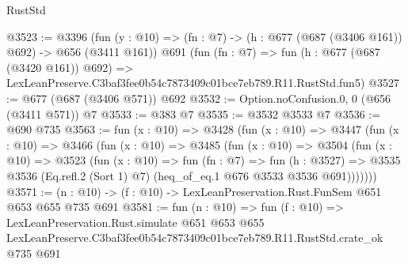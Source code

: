 \begin{lexlean}{RustStd}
\begin{coremodule}
@3523 := @3396
    (fun (y : @10) => (fn : @7) -> (h : @677 (@687 (@3406 @161)) @692) -> @656 (@3411 @161))
    @691
    (fun (fn : @7) =>
    fun (h : @677 (@687 (@3420 @161)) @692) =>
    LexLeanPreserve.C3baf3fee0b54c7873409c01bce7eb789.R11.RustStd.fun5)
@3527 := @677 (@687 (@3406 @571)) @692
@3532 := Option.noConfusion.{0, 0} (@656 (@3411 @571)) @7
@3533 := @383 @7
@3535 := @3532 @3533 @7
@3536 := @690 @735
@3563 := fun (x : @10) =>
  @3428
    (fun (x : @10) =>
    @3447
      (fun (x : @10) =>
      @3466
        (fun (x : @10) =>
        @3485
          (fun (x : @10) =>
          @3504
            (fun (x : @10) =>
            @3523
              (fun (x : @10) =>
              fun (fn : @7) =>
              fun (h : @3527) =>
              @3535 @3536 (Eq.refl.{2} (Sort 1) @7) (heq_of_eq.{1} @676 @3533 @3536 @691)))))))
@3571 := (n : @10) -> (f : @10) -> LexLeanPreservation.Rust.FunSem @651 @653 @655 @735 @691
@3581 := fun (n : @10) =>
  fun (f : @10) =>
  LexLeanPreservation.Rust.simulate
    @651
    @653
    @655
    LexLeanPreserve.C3baf3fee0b54c7873409c01bce7eb789.R11.RustStd.crate_ok
    @735
    @691
\end{coremodule}
\end{lexlean}
